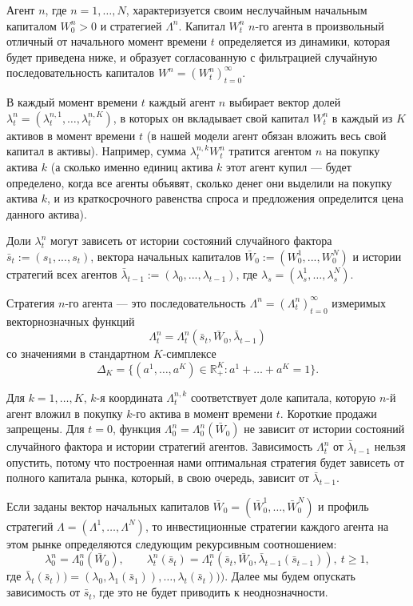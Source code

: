 \documentclass[a4paper,12pt,russian]{article} %
\theoremstyle{definition}
\newcommand{\R}{\mathbb{R}}
\begin{document}
Агент $n$, где $n=1,\ldots,N$, характеризуется своим неслучайным начальным капиталом $W^n_0 >0$ и стратегией $\Lambda^n$. Капитал $W_t^n$ $n$-го агента в произвольный отличный от начального момент времени $t$ определяется из динамики, которая будет приведена ниже, и образует согласованную с фильтрацией случайную последовательность капиталов $W^n = (W_t^n)_{t=0}^\infty$.

В каждый момент времени $t$ каждый агент $n$ выбирает вектор долей $\lambda_t^n = (\lambda_{t}^{n,1},\ldots,\lambda_{t}^{n,K})$, в которых он вкладывает свой капитал $W_t^n$ в каждый из $K$ активов в момент времени $t$ (в нашей модели агент обязан вложить весь свой капитал в активы). Например, сумма $\lambda_{t}^{n,k} W_t^n$ тратится агентом $n$ на покупку актива $k$ (а сколько именно единиц актива $k$ этот агент купил — будет определено, когда все агенты объявят, сколько денег они выделили на покупку актива $k$, и из краткосрочного равенства спроса и предложения определится цена данного актива).

Доли $\lambda_t^n$ могут зависеть от истории состояний случайного фактора $\bar s_{t} := (s_1,...,s_{t})$,  вектора начальных капиталов $ \bar W_0 := (W_0^1,...,W_0^N)$ и истории стратегий всех агентов 
$\bar \lambda_{t-1} := ( \lambda_0,..., \lambda_{t-1})$, где $ \lambda_s = (\lambda^1_s, \dots, \lambda^N_s )$.

Стратегия $n$-го агента — это последовательность $\Lambda^n =
(\Lambda_t^n)_{t=0}^\infty$ измеримых векторнозначных функций 
\[
\Lambda_t^n =\Lambda_t^n(\bar s_{t},\bar W_0 , \bar \lambda_{t-1})
\]
со значениями в стандартном $K$-симплексе 
\[
\Delta_K
=\{ (a^1, \dots, a^K) \in \R^K_+ : a^1+\ldots+a^K = 1\}.
\]


Для $k=1,\ldots,K$, $k$-я координата $\Lambda_t^{n,k}$ соответствует доле капитала, которую 
$n$-й агент вложил в покупку $k$-го актива в момент времени $t$. Короткие продажи запрещены.
Для $t=0$, функция $\Lambda_0^n = \Lambda_0^n(\bar W_0)$ не зависит от истории состояний случайного фактора и истории стратегий агентов.
Зависимость $\Lambda_t^n$ от  $\bar \lambda_{t-1}$ нельзя опустить, потому что построенная нами оптимальная стратегия будет зависеть от полного капитала рынка, который, в свою очередь, зависит от $\bar \lambda_{t-1}$. 

Если заданы вектор начальных капиталов $\bar W_0=(\bar W_0^1,\ldots, \bar W_0^N)$ и профиль стратегий $\Lambda=(\Lambda^1,\dots,\Lambda^N)$, то инвестиционные стратегии каждого агента на этом рынке определяются следующим рекурсивным соотношением: 
\begin{equation}
\label{1-realization-of-strategy}
\lambda_0^n = \Lambda_0^n(\bar W_0), \qquad
\lambda_t^n(\bar s_{t}) = \Lambda_t^n( \bar s_{t}, \bar W_0, \bar \lambda_{t-1}( \bar s_{t-1})),\ t\ge 1,
\end{equation}
где  $ \bar \lambda_{t}( \bar s_{t})) = ( \lambda_0, \lambda_{1}(\bar s_{1})),\dots, \lambda_{t}(  \bar s_{t}) ))$.
Далее мы будем опускать зависимость от  $\bar s_{t}$, где это не будет приводить к неоднозначности.  
\end{document}
